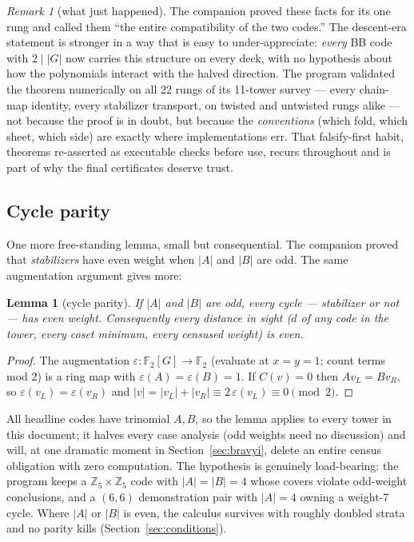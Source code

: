 \documentclass[11pt]{article}
\theoremstyle{plain}
\newtheorem{lemma}[theorem]{Lemma}
\theoremstyle{definition}
\theoremstyle{remark}
\newtheorem{remark}[theorem]{Remark}
\newcommand{\F}{\mathbb{F}}
\newcommand{\Z}{\mathbb{Z}}
\newcommand{\wt}[1]{\lvert #1\rvert}
\begin{document}
\begin{remark}[what just happened]
The companion proved these facts for its one rung and called them ``the
entire compatibility of the two codes.'' The descent-era statement is
stronger in a way that is easy to under-appreciate: \emph{every} BB code
with $2 \mid \lvert G \rvert$ now carries this structure on every deck,
with no hypothesis about how the polynomials interact with the halved
direction. The program validated the theorem numerically on all 22 rungs
of its 11-tower survey --- every chain-map identity, every stabilizer
transport, on twisted and untwisted rungs alike --- not because the proof
is in doubt, but because the \emph{conventions} (which fold, which sheet,
which side) are exactly where implementations err. That falsify-first
habit, theorems re-asserted as executable checks before use, recurs
throughout and is part of why the final certificates deserve trust.
\end{remark}

\subsection{Cycle parity}

One more free-standing lemma, small but consequential. The companion
proved that \emph{stabilizers} have even weight when $\wt A$ and $\wt B$
are odd. The same augmentation argument gives more:

\begin{lemma}[cycle parity]\label{lem:parity}
If $\wt A$ and $\wt B$ are odd, every cycle --- stabilizer or not --- has
even weight. Consequently every distance in sight ($d$ of any code in the
tower, every coset minimum, every censused weight) is even.
\end{lemma}

\begin{proof}
The augmentation $\varepsilon : \F_2[G] \to \F_2$ (evaluate at $x = y =
1$; count terms mod 2) is a ring map with $\varepsilon(A) =
\varepsilon(B) = 1$. If $C(v) = 0$ then $A v_L = B v_R$, so
$\varepsilon(v_L) = \varepsilon(v_R)$ and $\wt{v} = \wt{v_L} + \wt{v_R}
\equiv 2\,\varepsilon(v_L) \equiv 0 \pmod 2$.
\end{proof}

All headline codes have trinomial $A, B$, so the lemma applies to every
tower in this document; it halves every case analysis (odd weights need no
discussion) and will, at one dramatic moment in Section~\ref{sec:bravyi},
delete an entire census obligation with zero computation. The hypothesis
is genuinely load-bearing: the program keeps a $\Z_5 \times \Z_5$ code
with $\wt A = \wt B = 4$ whose covers violate odd-weight conclusions, and
a $(6,6)$ demonstration pair with $\wt A = 4$ owning a weight-7 cycle.
Where $\wt A$ or $\wt B$ is even, the calculus survives with roughly
doubled strata and no parity kills (Section~\ref{sec:conditions}).
\end{document}
